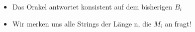 \begin{frame}
\begin{columns}
	
	\begin{itemize}
	  \item Das Orakel antwortet konsistent auf dem bisherigen $B_i$
	  \item Wir merken uns alle Strings der L\"ange n, die $M_i$ an fragt!
	\end{itemize}
	\end{columns}
	
\end{frame}